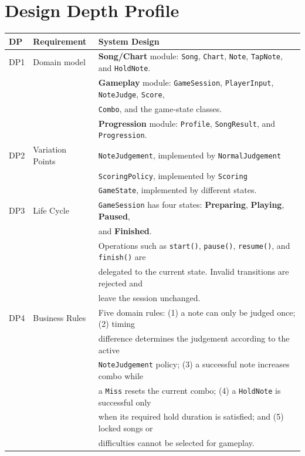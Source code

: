 \documentclass[12pt,a4paper]{article}
\begin{document}
\section{Design Depth Profile}
    \begin{table}[H]
        \centering
        \small
        \begin{tabular}{@{}lll@{}}
        \toprule
        DP & Requirement & System Design \\
        \midrule

        DP1 &
        Domain model&
        \textbf{Song/Chart} module: \texttt{Song}, \texttt{Chart},
        \texttt{Note}, \texttt{TapNote}, and \texttt{HoldNote}. \\ & &
        \textbf{Gameplay} module: \texttt{GameSession},
        \texttt{PlayerInput}, \texttt{NoteJudge}, \texttt{Score}, \\ & &
        \texttt{Combo}, and the game-state classes. \\ & &
        \textbf{Progression} module: \texttt{Profile},
        \texttt{SongResult}, and \texttt{Progression}.\\

        \addlinespace

        DP2 &
        Variation Points &
        \texttt{NoteJudgement}, implemented by \texttt{NormalJudgement} \\ & &
        \texttt{ScoringPolicy}, implemented by \texttt{Scoring} \\ & &
        \texttt{GameState}, implemented by different states. \\

        \addlinespace

        DP3 &
        Life Cycle &
        \texttt{GameSession} has four states: \textbf{Preparing},
        \textbf{Playing}, \textbf{Paused}, \\ & & and \textbf{Finished}. \\ & & 
        Operations such as \texttt{start()}, \texttt{pause()},
        \texttt{resume()}, and \texttt{finish()} are \\ & & delegated to the
        current state. Invalid transitions are rejected and \\ & & leave the
        session unchanged. \\

        \addlinespace
        DP4 &
        Business Rules &
        Five domain rules:
        (1) a note can only be judged once; (2) timing \\ & & difference
        determines the judgement according to the active \\ & & 
        \texttt{NoteJudgement} policy; (3) a successful note increases
        combo while \\ & & a \texttt{Miss} resets the current combo; (4) a
        \texttt{HoldNote} is successful only \\ & &when its required hold
        duration is satisfied; and (5) locked songs or \\ & & difficulties
        cannot be selected for gameplay. \\


\end{tabular}
\end{table}
\end{document}
